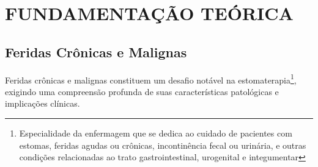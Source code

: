 \section{FUNDAMENTAÇÃO TEÓRICA}

\subsection{Feridas Crônicas e Malignas}

Feridas crônicas e malignas constituem um desafio notável na estomaterapia\footnote{Especialidade da enfermagem que se dedica ao cuidado de pacientes com estomas, feridas agudas ou crônicas, incontinência fecal ou urinária, e outras condições relacionadas ao trato gastrointestinal, urogenital e integumentar}, exigindo uma compreensão profunda de suas características patológicas e implicações clínicas.\cite{firmino2021topical}

